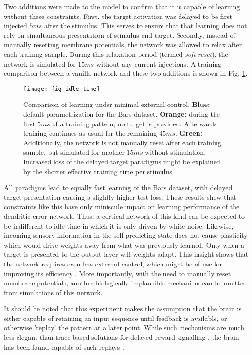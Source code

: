 Two additions were made to the model to confirm that it is capable of learning without these constraints. First, the
target activation was delayed to be first injected $5ms$ after the stimulus. This serves to ensure that  that learning
does not rely on simultaneous presentation of stimulus and target. Secondly, instead of manually resetting membrane
potentials, the network was allowed to relax after each training sample. During this relaxation period  (termed
\textit{soft reset}), the network is simulated for $15ms$ without any current injections. A training comparison between
a vanilla network and these two additions is shown in Fig. \ref{fig-idle-time}.


\begin{figure}[h]
    \centering
    \texttt{[image: fig\_idle\_time]}
    \caption[Comparison of learning under minimal external control]{Comparison of learning under minimal external
        control. \textbf{Blue:} default parametrization for the Bars dataset. \textbf{Orange:} during the first $5ms$ of
        a training pattern, no target is provided. Afterwards training continues as usual for the remaining $45ms$.
        \textbf{Green:} Additionally, the network is not manually reset after each training sample, but simulated for
        another $15ms$ without stimulation. Increased loss of the delayed target paradigms might be explained by the
        shorter effective training time per stimulus.}
    \label{fig-idle-time}
\end{figure}

All paradigms lead to equally fast learning of the Bars dataset, with delayed target presentation causing a slightly
higher test loss. These results show that constraints like this have only miniscule impact on learning performance of
the dendritic error network. Thus, a cortical network of this kind can be expected to be indifferent to idle time in
which it is only driven by white noise. Likewise, incoming sensory information in the self-predicting state does not
cause plasticity which would drive weights away from what was previously learned. Only when a target is presented to the
output layer will weights adapt. This insight shows that the network requires even less external control, which might be
of use for improving its efficiency . More importantly, with the need to manually reset membrane
potentials, another biologically implausible mechanism can be omitted from simulations of this network.

It should be noted that this experiment makes the assumption that the brain is either capable of retaining an input
sequence until feedback is available, or otherwise 'replay' the pattern at a later point. While such mechanisms are much
less elegant than trace-based solutions for delayed reward signalling \citep{bellec2020solution}, the brain has been
found capable of such replays \citep{Marblestone2016}.
